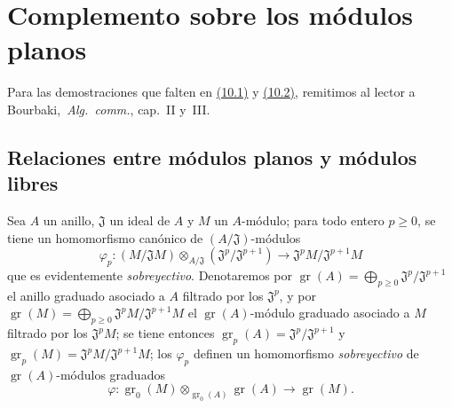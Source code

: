 \section{Complemento sobre los módulos planos}
\label{section:0.10}
\label{section:0.10-fr}

Para las demostraciones que falten en \hyperref[subsection:0.10.1]{(10.1)} y \hyperref[subsection:0.10.2]{(10.2)}, remitimos al lector a Bourbaki,~\emph{Alg.~comm.}, cap.~II y~III.

\subsection{Relaciones entre módulos planos y módulos libres}
\label{subsection:0.10.1}
\label{subsection:0.10.1-fr}

\begin{env}[10.1.1]
\label{0.10.1.1}
\label{0.10.1.1-fr}
Sea $A$ un anillo, $\mathfrak{J}$ un ideal de $A$ y $M$ un $A$-módulo;
para todo entero $p\geq0$, se tiene un homomorfismo canónico de $(A/\mathfrak{J})$-módulos
\[
\label{0.10.1.1.1-fr}
  \varphi_p:(M/\mathfrak{J}M)\otimes_{A/\mathfrak{J}}
  (\mathfrak{J}^p/\mathfrak{J}^{p+1})
  \longrightarrow \mathfrak{J}^pM/\mathfrak{J}^{p+1}M
  \tag{10.1.1.1}
\]
que es evidentemente \emph{sobreyectivo}.
Denotaremos por $\operatorname{gr}(A)=\bigoplus_{p\geq0}\mathfrak{J}^p/\mathfrak{J}^{p+1}$ el anillo graduado asociado a $A$ filtrado por los $\mathfrak{J}^p$, y por $\operatorname{gr}(M)=\bigoplus_{p\geq0}\mathfrak{J}^pM/\mathfrak{J}^{p+1}M$ el $\operatorname{gr}(A)$-módulo graduado asociado a $M$ filtrado por los $\mathfrak{J}^pM$;
se tiene entonces $\operatorname{gr}_p(A)=\mathfrak{J}^p/\mathfrak{J}^{p+1}$ y $\operatorname{gr}_p(M)=\mathfrak{J}^pM/\mathfrak{J}^{p+1}M$;
los $\varphi_p$ definen un homomorfismo \emph{sobreyectivo} de $\operatorname{gr}(A)$-módulos graduados
\[
\label{0.10.1.1.2-fr}
  \varphi:\operatorname{gr}_0(M)\otimes_{\operatorname{gr}_0(A)}
  \operatorname{gr}(A)\longrightarrow\operatorname{gr}(M).
  \tag{10.1.1.2}
\]
\end{env}

